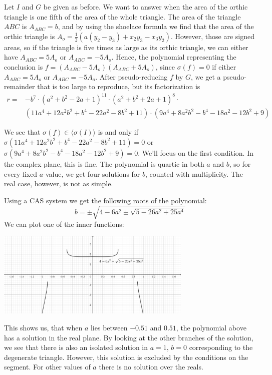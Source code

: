\begin{example}\upshape
  Let $I$ and $G$ be given as before. We want to answer when the area of the orthic triangle is one fifth of the area of the whole triangle. The area of the triangle $ABC$ is $A_{ABC} = b$, and by using the shoelace formula we find that the area of the orthic triangle is $A_{o} = \frac{1}{2}(a(y_{2} - y_{3}) + x_{2} y_{3} - x_{3} y_{2})$. However, those are signed areas, so if the triangle is five times as large as its orthic triangle, we can either have $A_{ABC} = 5 A_{o}$ or $A_{ABC} = -5 A_{o}$. Hence, the polynomial representing the conclusion is $f = (A_{ABC} - 5 A_{o})(A_{ABC} + 5 A_{o})$, since $\sigma(f) = 0$ if either $A_{ABC} = 5 A_{o}$ or $A_{ABC} = -5 A_{o}$. After pseudo-reducing $f$ by $G$, we get a pseudo-remainder that is too large to reproduce, but its factorization is
  \begin{align*}
    r = &-b^{7} \cdot (a^{2} + b^{2} - 2a + 1)^{11} \cdot (a^{2} + b^{2} + 2a + 1)^{8} \cdot \\
        &(11a^{4} + 12a^{2}b^{2} + b^{4} - 22a^{2} - 8b^{2} + 11) \cdot (9a^{4} + 8a^{2}b^{2} - b^{4} - 18a^{2} - 12b^{2} + 9)
  \end{align*}

  We see that $\sigma(f) \in \langle \sigma(I) \rangle$ is and only if $\sigma(11a^{4} + 12a^{2}b^{2} + b^{4} - 22a^{2} - 8b^{2} + 11) = 0$ or $\sigma(9a^{4} + 8a^{2}b^{2} - b^{4} - 18a^{2} - 12b^{2} + 9) = 0$. We'll focus on the first condition. In the complex plane, this is fine. The polynomial is quartic in both $a$ and $b$, so for every fixed $a$-value, we get four solutions for $b$, counted with multiplicity. The real case, however, is not as simple.

  Using a CAS system we get the following roots of the polynomial:
  \[b = \pm \sqrt{4 - 6 a^2 \pm \sqrt{5 - 26 a^2 + 25 a^4}}\]
  We can plot one of the inner functions:

  \begin{center}
    \includegraphics[width=0.7\textwidth]{geogebra_sqrt.png}
  \end{center}
  This shows us, that when $a$ lies between $-0.51$ and $0.51$, the polynomial above has a solution in the real plane. By looking at the other branches of the solution, we see that there is also an isolated solution in $a = 1$, $b = 0$ corresponding to the degenerate triangle. However, this solution is excluded by the conditions on the segment. For other values of $a$ there is no solution over the reals.


\end{example}
